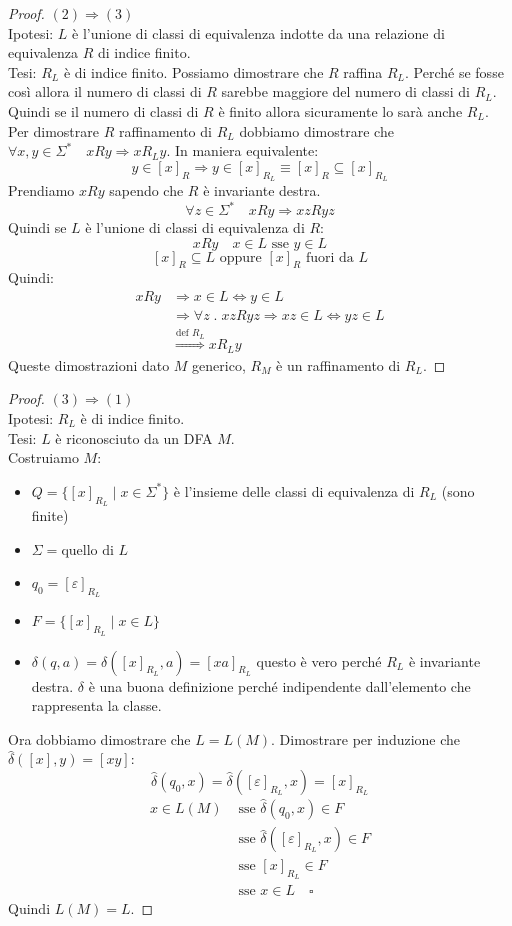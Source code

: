 \documentclass[a4paper]{article}
\begin{document}
\begin{proof}
 $(2) \Rightarrow (3)$\\
 Ipotesi: $L$ è l'unione di classi di equivalenza indotte da una relazione di equivalenza $R$ di indice finito.\\
 Tesi: $R_L$ è di indice finito.
 Possiamo dimostrare che $R$ raffina $R_L$. Perché se fosse così allora il numero di classi di $R$ 
sarebbe maggiore del numero di classi di $R_L$. Quindi se il numero di classi di $R$ è finito allora sicuramente
lo sarà anche $R_L$.
Per dimostrare $R$ raffinamento di $R_L$ dobbiamo dimostrare che $\forall x,y \in \Sigma^* \quad xRy \Rightarrow xR_Ly$.
In maniera equivalente:
\[y \in [x]_R \Rightarrow y \in [x]_{R_L} \equiv [x]_R \subseteq [x]_{R_L}\]
Prendiamo $xRy$ sapendo che $R$ è invariante destra.
\[
\forall z \in \Sigma^* \quad xRy \Rightarrow xzRyz
\]
Quindi se $L$ è l'unione di classi di equivalenza di $R$:
\[xRy \quad x \in L \text{ sse } y \in L\]
\[[x]_R \subseteq L \text{ oppure } [x]_R \text{ fuori da } L\]
Quindi:
\[
\begin{aligned}
  xRy &\Longrightarrow x \in L \Longleftrightarrow y \in L\\
  &\Longrightarrow \forall z \; . \; xzRyz \Longrightarrow xz \in L \Longleftrightarrow yz \in L\\
  &\stackrel{\text{def } R_L}{\Longrightarrow} xR_Ly
\end{aligned}
\]
Queste dimostrazioni dato $M$ generico, $R_M$ è un raffinamento
di $R_L$.
\end{proof}
\begin{proof}
  $(3) \Rightarrow (1)$\\
  Ipotesi: $R_L$ è di indice finito.\\
  Tesi: $L$ è riconosciuto da un DFA $M$.\\
  Costruiamo $M$:
  \begin{itemize}
    \item  $Q = \{[x]_{R_L} \; | \; x \in \Sigma^*\}$ è l'insieme delle classi di equivalenza di $R_L$ (sono finite)
    \item $\Sigma = \text{quello di } L$
    \item $q_0 = [\varepsilon]_{R_L}$
    \item $F = \{[x]_{R_L} \; | \; x \in L\}$
    \item $\delta(q, a) = \delta([x]_{R_L}, a) = [xa]_{R_L}$ questo è vero perché $R_L$ è invariante destra.
    $\delta$ è una buona definizione perché indipendente dall'elemento che rappresenta la classe.
  \end{itemize}
  Ora dobbiamo dimostrare che $L = L(M)$.
  Dimostrare per induzione che $\hat{\delta}([x], y) = [xy]$:
  \[\hat{\delta}(q_0,x) = \hat{\delta}([\varepsilon]_{R_L},x) = [x]_{R_L}\]
  \[
  \begin{aligned}
    x \in L(M) &\text{ sse } \hat{\delta}(q_0,x) \in F\\
    &\text{ sse } \hat{\delta}([\varepsilon]_{R_L},x) \in F\\
    &\text{ sse } [x]_{R_L} \in F\\
    &\text{ sse } x \in L \quad \square
  \end{aligned}
  \]
  Quindi $L(M) = L$.
\end{proof}
\end{document}
